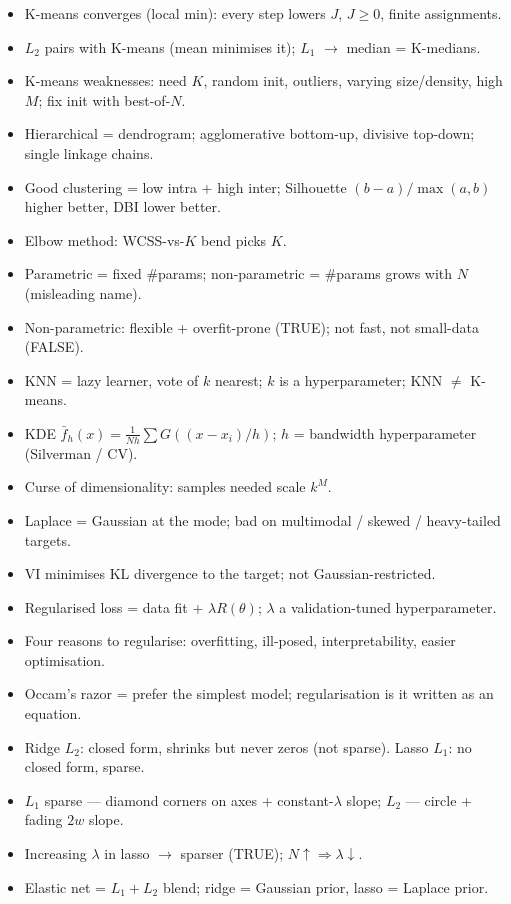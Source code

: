 \documentclass[11pt, a4paper]{article}
\begin{document}
\begin{tldrbox}
\begin{itemize}[leftmargin=*]
  \item K-means converges (local min): every step lowers $J$, $J\ge0$, finite assignments.
  \item $L_2$ pairs with K-means (mean minimises it); $L_1$ $\to$ median = K-medians.
  \item K-means weaknesses: need $K$, random init, outliers, varying size/density, high $M$; fix init with best-of-$N$.
  \item Hierarchical = dendrogram; agglomerative bottom-up, divisive top-down; single linkage chains.
  \item Good clustering = low intra + high inter; Silhouette $(b{-}a)/\max(a,b)$ higher better, DBI lower better.
  \item Elbow method: WCSS-vs-$K$ bend picks $K$.
  \item Parametric = fixed \#params; non-parametric = \#params grows with $N$ (misleading name).
  \item Non-parametric: flexible + overfit-prone (TRUE); not fast, not small-data (FALSE).
  \item KNN = lazy learner, vote of $k$ nearest; $k$ is a hyperparameter; KNN $\ne$ K-means.
  \item KDE $\bar f_h(x)=\frac{1}{Nh}\sum G((x-x_i)/h)$; $h$ = bandwidth hyperparameter (Silverman / CV).
  \item Curse of dimensionality: samples needed scale $k^M$.
  \item Laplace = Gaussian at the mode; bad on multimodal / skewed / heavy-tailed targets.
  \item VI minimises KL divergence to the target; not Gaussian-restricted.
  \item Regularised loss = data fit + $\lambda R(\theta)$; $\lambda$ a validation-tuned hyperparameter.
  \item Four reasons to regularise: overfitting, ill-posed, interpretability, easier optimisation.
  \item Occam's razor = prefer the simplest model; regularisation is it written as an equation.
  \item Ridge $L_2$: closed form, shrinks but never zeros (not sparse). Lasso $L_1$: no closed form, sparse.
  \item $L_1$ sparse — diamond corners on axes + constant-$\lambda$ slope; $L_2$ — circle + fading $2w$ slope.
  \item Increasing $\lambda$ in lasso $\to$ sparser (TRUE); $N\uparrow\Rightarrow\lambda\downarrow$.
  \item Elastic net = $L_1{+}L_2$ blend; ridge = Gaussian prior, lasso = Laplace prior.

\end{itemize}
\end{tldrbox}
\end{document}
